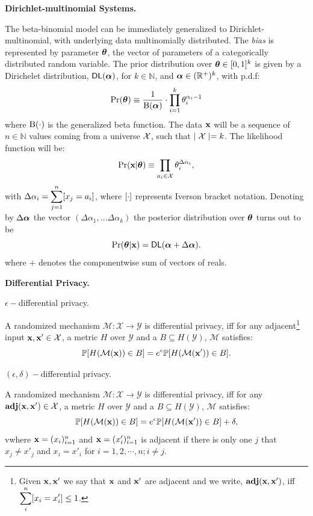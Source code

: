 \documentclass{article}
\begin{document}
\noindent \textbf{Dirichlet-multinomial Systems.}

The beta-binomial model can be immediately generalized to Dirichlet-multinomial, with underlying data multinomially distributed. The \emph{bias} is represented by parameter $\boldsymbol{\theta}$, the vector of parameters of a categorically distributed random variable. The prior distribution over $\boldsymbol{\theta}\in [0,1]^{k}$
is given by a Dirichelet distribution, $\mathsf{DL}(\boldsymbol{\alpha})$, for $k\in\mathbb{N}$,
and $\boldsymbol{\alpha}\in(\mathbb{R}^{+})^{k}$, with p.d.f:
\[
  \Pr(\boldsymbol{\theta})\equiv\frac{1}{\boldsymbol{\textup{B}}(\boldsymbol{\alpha})}\cdot \displaystyle\prod_{i=1}^{k}{\theta_i^{\alpha_i-1}}
\]
where $\boldsymbol{\textup{B}}(\cdot)$ is the generalized beta function.
The data $\textbf{x}$ will be a sequence of $n\in\mathbb{N}$ values
coming from a universe $\mathcal{X}$, such that $\mid\mathcal{X} \mid=k$.
The likelihood function will be:
\[
  \Pr(\textbf{x}|\boldsymbol{\theta})\equiv \displaystyle\prod_{a_i\in\mathcal{X}}\theta_{i}^{\Delta \alpha_i},
\]
with $\Delta \alpha_i=\displaystyle\sum_{j=1}^{n}[x_j=a_i]$, where $[\cdot]$ represents Iverson bracket notation.
Denoting by $\Delta\boldsymbol{\alpha}$ the vector $(\Delta\alpha_1,\dots \Delta\alpha_k)$ the posterior distribution over $\boldsymbol{\theta}$ turns out to be
\[
  \Pr(\boldsymbol{\theta}|\textbf{x})=\mathsf{DL}(\boldsymbol{\alpha}+\Delta \boldsymbol{\alpha}). 
\]
where $+$ denotes the componentwise sum of vectors of reals. 

\noindent \textbf{Differential Privacy.} 
\begin{definition}
$\epsilon-$differential privacy.

A randomized mechanism $\mathcal{M}: \mathcal{X} \rightarrow \mathcal{Y}$ is differential privacy, iff for any adjacent\footnote{Given $\textbf{x}, \textbf{x}'$  we say that $\textbf{x}$ and $\textbf{x}'$ are adjacent and we write, $\textbf{adj}(\textbf{x},\textbf{x}')$, iff\\
$\displaystyle \sum_{i}^{n}[x_i = x'_i ]\leq 1$. } input $\textbf{x}, \textbf{x}' \in \mathcal{X}$, a metric $H$ over $\mathcal{Y}$ and a $B \subseteq H(\mathcal{Y})$, $\mathcal{M}$ satisfies:
\begin{equation*}
\mathbb{P}[H(\mathcal{M}(\textbf{x})) \in B] = e^\epsilon \mathbb{P}[H(\mathcal{M}(\textbf{x}')) \in B].
\end{equation*}

\end{definition}

\begin{definition}
$(\epsilon,\delta)-$differential privacy.

A randomized mechanism $\mathcal{M}: \mathcal{X} \rightarrow \mathcal{Y}$ is differential privacy, iff for any $\textbf{adj}(\textbf{x},\textbf{x}') \in \mathcal{X}$, a metric $H$ over $\mathcal{Y}$ and a $B \subseteq H(\mathcal{Y})$, $\mathcal{M}$ satisfies:
\begin{equation*}
\mathbb{P}[H(\mathcal{M}(\textbf{x})) \in B] = e^\epsilon \mathbb{P}[H(\mathcal{M}(\textbf{x}')) \in B] + \delta,
\end{equation*}
vwhere $\textbf{x} = (x_i)_{i = 1}^n$ and $\textbf{x} = (x'_i)_{i = 1}^n$ is adjacent if there is only one $j$ that $x_j \neq x'_j$ and $x_i = x'_i$ for $i = 1, 2, \cdots, n; i \neq j$. 
\end{definition}
\end{document}
